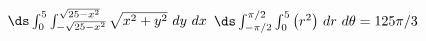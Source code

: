 {$\ds \int_{0}^{5}\int_{-\sqrt{25-x^2}}^{\sqrt{25-x^2}} \sqrt{x^2+y^2}\ dy\ dx$
}
{$\ds \int_{-\pi/2}^{\pi/2}\int_{0}^{5} \big(r^2\big)\ dr\ d\theta=125\pi/3$
}